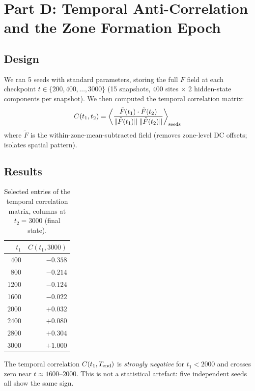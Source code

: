 \documentclass[11pt,a4paper]{article}
\begin{document}
\section{Part D: Temporal Anti-Correlation and the Zone Formation Epoch}
\label{sec:partD}

\subsection{Design}

We ran 5 seeds with standard parameters, storing the full $F$ field at each
checkpoint $t \in \{200, 400, \ldots, 3000\}$ (15 snapshots, 400 sites
$\times$ 2 hidden-state components per snapshot).  We then computed the
temporal correlation matrix:
\begin{equation}
  C(t_1, t_2) = \left\langle
    \frac{\tilde{F}(t_1) \cdot \tilde{F}(t_2)}
         {\|\tilde{F}(t_1)\|\;\|\tilde{F}(t_2)\|}
  \right\rangle_{\rm seeds}
\end{equation}
where $\tilde{F}$ is the within-zone-mean-subtracted field (removes
zone-level DC offsets; isolates spatial pattern).

\subsection{Results}

\begin{table}[h]
\centering
\caption{Selected entries of the temporal correlation matrix, columns at
         $t_2 = 3000$ (final state).}
\label{tab:temporal}
\begin{tabular}{rr}
\toprule
$t_1$ & $C(t_1, 3000)$ \\
\midrule
 400 & $-0.358$ \\
 800 & $-0.214$ \\
1200 & $-0.124$ \\
1600 & $-0.022$ \\
2000 & $+0.032$ \\
2400 & $+0.080$ \\
2800 & $+0.304$ \\
3000 & $+1.000$ \\
\bottomrule
\end{tabular}
\end{table}

The temporal correlation $C(t_1, T_{\rm end})$ is \emph{strongly negative}
for $t_1 < 2000$ and crosses zero near $t \approx 1600$--$2000$.  This is not
a statistical artefact: five independent seeds all show the same sign.
\end{document}
